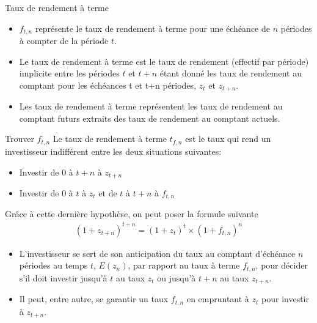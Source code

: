 \documentclass{beamer}
\begin{document}
\begin{frame}{Taux de rendement à terme}
\begin{itemize}
\item $f_{t,n}$ représente le taux de rendement à terme pour une échéance de $n$ périodes à compter de la période $t$.  
\item Le taux de rendement à terme est le taux de rendement (effectif par période) implicite entre les périodes $t$ et $t+n$ étant donné les taux de rendement au comptant pour les échéances t et t+n périodes,  $z_t$ et $z_{t+n}$.
\item Les taux de rendement à terme représentent les taux de rendement au comptant futurs extraits des taux de rendement au comptant actuels.
\end{itemize}
\end{frame}
\begin{frame}{Trouver $f_{t,n}$}
Le taux de rendement à terme $t_{f,n}$ est le taux qui rend un investisseur indifférent entre les deux situations suivantes:
\begin{itemize}
\item Investir de $0$ à $t+n$ à $z_{t+n}$
\item Investir de $0$ à $t$ à $z_t$ et de $t$ à $t+n$ à $f_{t,n}$
\end{itemize}
Grâce à cette dernière hypothèse, on peut poser la formule suivante
\begin{align*}
(1+z_{t+n})^{t+n}=(1+z_t)^t \times (1+f_{t,n})^n
\end{align*}
\begin{itemize}
\item L’investisseur se sert de son anticipation du taux au comptant d’échéance $n$ périodes au temps $t$,  $E(z_n)$,  par rapport au taux à terme $f_{t,n}$,  pour décider s’il doit investir jusqu’à $t$ au taux $z_t$ ou jusqu’à $t+n$ au taux $z_{t+n}$.  
\item  Il peut,  entre autre,  se garantir un taux $f_{t,n}$ en empruntant à $z_t$ pour investir à $z_{t+n}$.
\end{itemize}
\end{frame}
\end{document}

